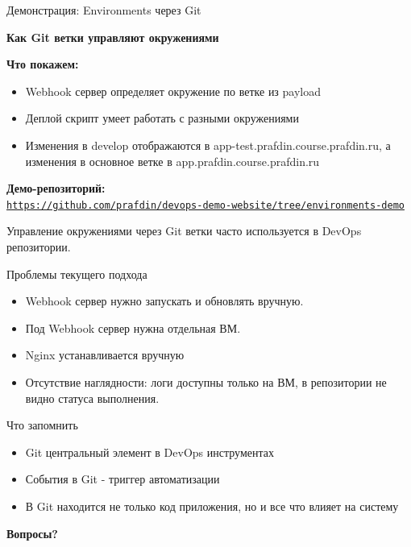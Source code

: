 \documentclass[aspectratio=169]{beamer}
\begin{document}
    \begin{frame}{Демонстрация: Environments через Git}
        \begin{center}
            \large
            \textbf{Как Git ветки управляют окружениями}
        \end{center}
        
        \vspace{0.3cm}
        
        \textbf{Что покажем:}
        \begin{itemize}
            \item Webhook сервер определяет окружение по ветке из payload
            \item Деплой скрипт умеет работать с разными окружениями
            \item Изменения в develop отображаются в app-test.prafdin.course.prafdin.ru, а изменения в основное ветке в app.prafdin.course.prafdin.ru
        \end{itemize}
        
        \vspace{0.2cm}
        \textbf{Демо-репозиторий:} \\
        \href{https://github.com/prafdin/devops-demo-website/tree/environments-demo}{\texttt{https://github.com/prafdin/devops-demo-website/tree/environments-demo}}
        
        \vspace{0.2cm}

        Управление окружениями через Git ветки часто используется в DevOps репозитории.
    \end{frame}

    \begin{frame}{Проблемы текущего подхода}
        \begin{itemize}
            \item Webhook сервер нужно запускать и обновлять вручную.
            \item Под Webhook сервер нужна отдельная ВМ.
            \item Nginx устанавливается вручную
            \item Отсутствие наглядности: логи доступны только на ВМ, в репозитории не видно статуса выполнения.
        \end{itemize}
    \end{frame}

    \begin{frame}{Что запомнить}
        \begin{itemize}
            \item Git центральный элемент в DevOps инструментах
            \item События в Git - триггер автоматизации
            \item В Git находится не только код приложения, но и все что влияет на систему
        \end{itemize}

        \vspace{1cm}

        \begin{center}
            \textbf{Вопросы?}
        \end{center}
    \end{frame}
\end{document}
